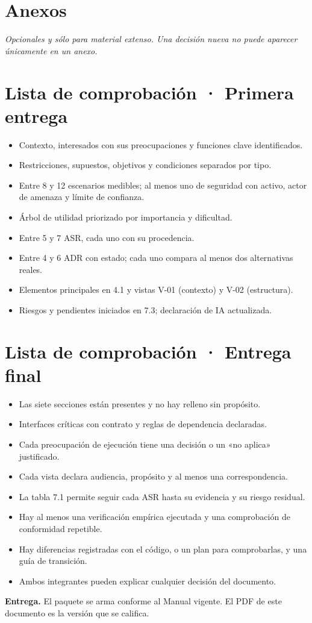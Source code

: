 \documentclass[11pt,letterpaper]{article}
\newcommand{\hint}[1]{{\itshape\color{black!70}#1}\par} %
\newcommand{\checkitem}[1]{\item[$\square$] #1}
\begin{document}
\section*{Anexos}
\hint{Opcionales y sólo para material extenso. Una decisión nueva no puede aparecer únicamente en un anexo.}

\newpage

\section*{Lista de comprobación · Primera entrega}
\begin{itemize}[label={},leftmargin=0pt,itemsep=1pt]
  \checkitem{Contexto, interesados con sus preocupaciones y funciones clave identificados.}
  \checkitem{Restricciones, supuestos, objetivos y condiciones separados por tipo.}
  \checkitem{Entre 8 y 12 escenarios medibles; al menos uno de seguridad con activo, actor de amenaza y límite de confianza.}
  \checkitem{Árbol de utilidad priorizado por importancia y dificultad.}
  \checkitem{Entre 5 y 7 ASR, cada uno con su procedencia.}
  \checkitem{Entre 4 y 6 ADR con estado; cada uno compara al menos dos alternativas reales.}
  \checkitem{Elementos principales en 4.1 y vistas V-01 (contexto) y V-02 (estructura).}
  \checkitem{Riesgos y pendientes iniciados en 7.3; declaración de IA actualizada.}
\end{itemize}

\section*{Lista de comprobación · Entrega final}
\begin{itemize}[label={},leftmargin=0pt,itemsep=1pt]
  \checkitem{Las siete secciones están presentes y no hay relleno sin propósito.}
  \checkitem{Interfaces críticas con contrato y reglas de dependencia declaradas.}
  \checkitem{Cada preocupación de ejecución tiene una decisión o un «no aplica» justificado.}
  \checkitem{Cada vista declara audiencia, propósito y al menos una correspondencia.}
  \checkitem{La tabla 7.1 permite seguir cada ASR hasta su evidencia y su riesgo residual.}
  \checkitem{Hay al menos una verificación empírica ejecutada y una comprobación de conformidad repetible.}
  \checkitem{Hay diferencias registradas con el código, o un plan para comprobarlas, y una guía de transición.}
  \checkitem{Ambos integrantes pueden explicar cualquier decisión del documento.}
\end{itemize}

\medskip
\begin{callout}
  {\small\bfseries\color{SADBlue}Entrega.} {\small El paquete se arma conforme al Manual vigente. El PDF de este documento es la versión que se califica.}
\end{callout}
\end{document}
